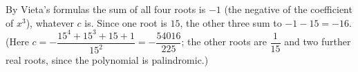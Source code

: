 By Vieta's formulas the sum of all four roots is $-1$ (the negative of the coefficient of $x^3$), whatever $c$ is. Since one root is $15$, the other three sum to $-1-15=\boxed{-16}$. (Here $c=-\dfrac{15^4+15^3+15+1}{15^2}=-\dfrac{54016}{225}$; the other roots are $\dfrac{1}{15}$ and two further real roots, since the polynomial is palindromic.)
